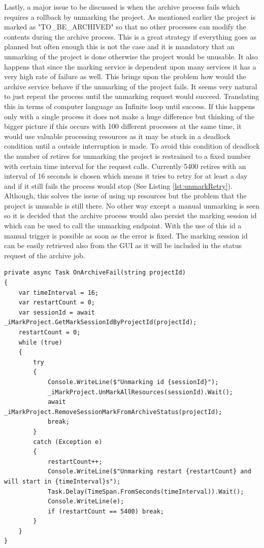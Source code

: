 Lastly, a major issue to be discussed is when the archive process fails which requires a rollback by unmarking the project. As mentioned earlier the project is
marked as "TO\_BE\_ARCHIVED" so that no other processes can modify the contents during the archive process. This is a great strategy if everything goes as planned but 
often enough this is not the case and it is mandatory that an unmarking of the project is done otherwise the project would be unusable. It also happens that since the
marking service is dependent upon many services it has a very high rate of failure as well. This brings upon the problem how would the archive service behave if the
unmarking of the project fails. It seems very natural to just repeat the process until the unmarking request would succeed. Translating this in terms of computer 
language an Infinite loop until success. If this happens only with a single process it does not make a huge difference but thinking of the bigger picture if this 
occurs with 100 different processes at the same time, it would use valuable processing resources as it may be stuck in a deadlock condition until a outside interruption
is made. To avoid this condition of deadlock the number of retires for unmarking the project is restrained to a fixed number with certain time interval for the request 
calls. Currently 5400 retires with an interval of 16 seconds is chosen which means it tries to retry for at least a day and if it still fails the process would stop 
(See Listing \ref{lst:unmarkRetry}). 
Although, this solves the issue of using up resources but the problem that the project is unusable is still there. No other way except a manual unmarking is seen so 
it is decided that the archive process would also persist the marking session id which can be used to call the unmarking endpoint. With the use of this id a manual 
trigger is possible as soon as the error is fixed. The marking session id can be easily retrieved also from the GUI as it will be included in the status request of
the archive job.

\newpage
\begin{lstlisting}[language={[Sharp]C}, caption={Unmarking retry implementation}, captionpos=b,label={lst:unmarkRetry}]
private async Task OnArchiveFail(string projectId)
{
    var timeInterval = 16;
    var restartCount = 0;
    var sessionId = await _iMarkProject.GetMarkSessionIdByProjectId(projectId);
    restartCount = 0;
    while (true)
    {
        try
        {
            Console.WriteLine($"Unmarking id {sessionId}");
            _iMarkProject.UnMarkAllResources(sessionId).Wait();
            await _iMarkProject.RemoveSessionMarkFromArchiveStatus(projectId);
            break;
        }
        catch (Exception e)
        {
            restartCount++;
            Console.WriteLine($"Unmarking restart {restartCount} and will start in {timeInterval}s");
            Task.Delay(TimeSpan.FromSeconds(timeInterval)).Wait();
            Console.WriteLine(e);
            if (restartCount == 5400) break;
        }
    }
}
\end{lstlisting}
